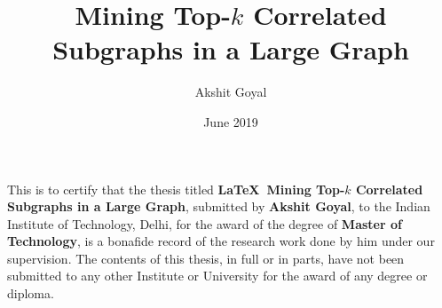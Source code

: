\documentclass[MTech]{iitddiss}
\begin{document}

\title{Mining Top-$k$ Correlated Subgraphs in a Large Graph}

\author{Akshit Goyal}
\date{June 2019}

\maketitle

% 






%
%
%


\certificate

\vspace*{0.5in}

\noindent This is to certify that the thesis titled {\bf \LaTeX\ Mining Top-$k$ Correlated Subgraphs in a Large Graph}, submitted by {\bf Akshit Goyal},
  to the Indian Institute of Technology, Delhi, for
the award of the degree of {\bf Master of Technology}, is a bonafide
record of the research work done by him under our supervision.  The
contents of this thesis, in full or in parts, have not been submitted
to any other Institute or University for the award of any degree or
diploma.
\end{document}

